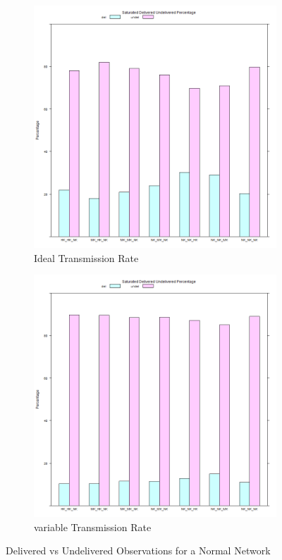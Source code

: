 	\begin{figure}[H]
\centering
\begin{subfigure}{.5\textwidth}
  \centering
\includegraphics[width=\linewidth]{Chap7/figures/plots/saturated_ideal/delvsundel_percent.png}
  \caption{Ideal Transmission Rate}
\label{fig:sim:res:sat:ideal:delundel}
\end{subfigure}%
\begin{subfigure}{.5\textwidth}
  \centering
	\includegraphics[width=\linewidth]{Chap7/figures/plots/saturated_variable/delvsundel_percent.png}
  \caption{variable Transmission Rate}
	\label{fig:sim:res:sat:variable:delundel}
\end{subfigure}
\caption{Delivered vs Undelivered Observations for a Normal Network}
\end{figure}

